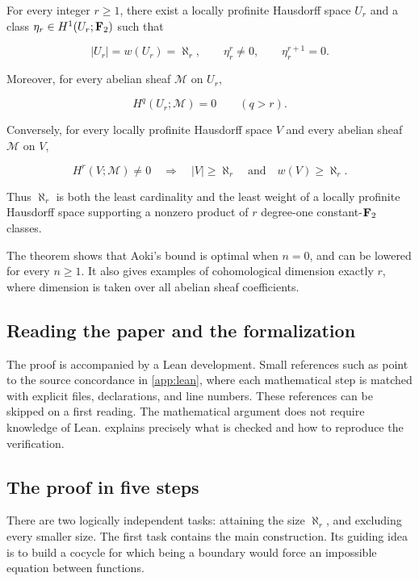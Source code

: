 \begin{theorem}\label{thm:main}
For every integer \(r\geq1\), there exist a locally profinite Hausdorff
space \(U_r\) and a class \(\eta_r\in H^1(U_r;\mathbf F_2)\) such that

\[
|U_r|=w(U_r)=\aleph_r,
\qquad \eta_r^r\neq0,
\qquad \eta_r^{r+1}=0.
\]

Moreover, for every abelian sheaf \(\mathcal M\) on \(U_r\),

\[
H^q(U_r;\mathcal M)=0\qquad(q>r).
\]

Conversely, for every locally profinite Hausdorff space \(V\) and every
abelian sheaf \(\mathcal M\) on \(V\),

\[
H^r(V;\mathcal M)\neq0
\quad\Longrightarrow\quad
|V|\geq\aleph_r\quad\text{and}\quad w(V)\geq\aleph_r.
\]

Thus \(\aleph_r\) is both the least cardinality and the least weight of a
locally profinite Hausdorff space supporting a nonzero product of \(r\)
degree-one constant-\(\mathbf F_2\) classes.
\end{theorem}

The theorem shows that Aoki's bound is optimal when \(n=0\), and can be
lowered for every \(n\geq1\). It also gives examples of cohomological
dimension exactly \(r\), where dimension is taken over all abelian sheaf
coefficients.

\subsection{Reading the paper and the formalization}

The proof is accompanied by a Lean development. Small references such as
 point to the source concordance in
\cref{app:lean}, where each mathematical step is matched with explicit
files, declarations, and line numbers. These references can be skipped
on a first reading. The mathematical argument does not require knowledge
of Lean.  explains precisely what is checked and
how to reproduce the verification.

\subsection{The proof in five steps}
\label{subsec:strategy}

There are two logically independent tasks: attaining the size
\(\aleph_r\), and excluding every smaller size. The first task contains
the main construction. Its guiding idea is to build a cocycle for which
being a boundary would force an impossible equation between functions.

